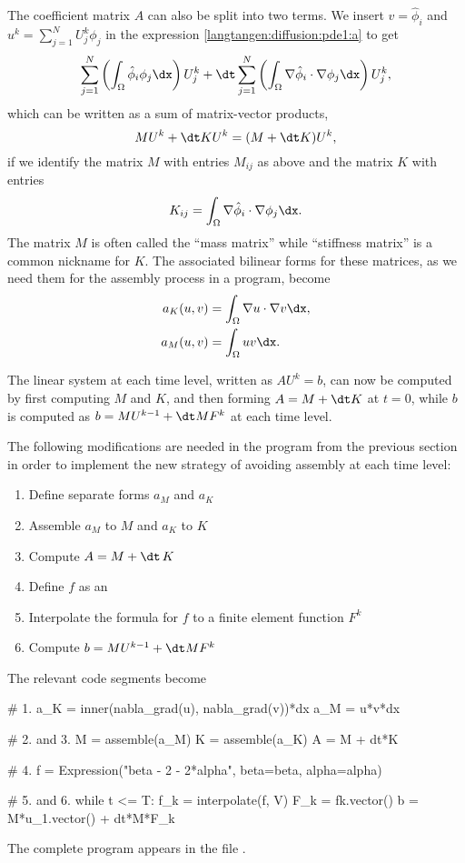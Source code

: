 The coefficient matrix $A$ can also be split into two terms.
We insert $v=\hat\phi_i$ and $u^k = \sum_{j=1}^N U^k_j\phi_j$ in
the expression \eqref{langtangen:diffusion:pde1:a} to get
\begin{equation}
 \sum_{j=1}^N \left(\int_\Omega \hat\phi_i\phi_j\dx\right)U^k_j
+ {\dt} \sum_{j=1}^N \left(\int_\Omega \nabla\hat\phi_i\cdot\nabla\phi_j\dx\right)U^k_j,
\end{equation}
which can be written as a sum of matrix-vector products,
\begin{equation}
 MU^k + {\dt} KU^k = (M + {\dt} K)U^k,
\end{equation}
if we identify the matrix $M$ with entries $M_{ij}$ as above and
the matrix $K$ with entries
\begin{equation}
  K_{ij} = \int_\Omega \nabla\hat\phi_i\cdot\nabla\phi_j\dx.
\end{equation}
The matrix $M$ is often called the ``mass matrix'' while ``stiffness
matrix'' is a common nickname for $K$. The associated bilinear forms for
these matrices, as we need them for the assembly process in a \fenics{}
program, become
\begin{align}
  a_K(u,v) &= \int_\Omega\nabla u\cdot\nabla v\dx,
\label{langtangen:diffusion:pde1:aK}
\\
  a_M(u,v) &= \int_\Omega uv\dx.
\label{langtangen:diffusion:pde1:aM}
\end{align}

The linear system at each time level, written as $AU^k=b$, can now be
computed by first computing $M$ and $K$, and then forming $A=M+{\dt}
K$ at $t=0$, while $b$ is computed as $b=MU^{k-1} + {\dt}MF^k$ at each
time level.

The following modifications are needed in the 
program from the previous section in order to implement the new strategy
of avoiding assembly at each time level:
\begin{enumerate}
\item Define separate forms $a_M$ and $a_K$
\item Assemble $a_M$ to $M$ and $a_K$ to $K$
\item Compute $A=M+{\dt}\, K$
\item Define $f$ as an 
\item Interpolate the formula for $f$ to a finite element function $F^k$
\item Compute $b=MU^{k-1} + {\dt}MF^k$
\end{enumerate}
The relevant code segments become
\begin{python}
# 1.
a_K = inner(nabla_grad(u), nabla_grad(v))*dx
a_M = u*v*dx

# 2. and 3.
M = assemble(a_M)
K = assemble(a_K)
A = M + dt*K

# 4.
f = Expression("beta - 2 - 2*alpha", beta=beta, alpha=alpha)

# 5. and 6.
while t <= T:
    f_k = interpolate(f, V)
    F_k = fk.vector()
    b = M*u_1.vector() + dt*M*F_k
\end{python}
The complete program appears in the file .

